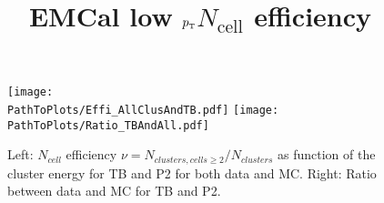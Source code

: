 \documentclass[ALICE]{ALICE_analysis_notes}
\newcommand{\pT}{$p_{\mbox{\tiny T}}$\xspace}
\newcommand{\PathToPlots}{/home/joshua/PCG_Software/EMCal_NCellEffi/13TeVNomB_Wide/Pi0Tagging_13TeV_nom_04_26_WithTRD_WithBorderCells_1cellFT/pdf}
\begin{document}
\title{EMCal low \pT $N_{\text{cell}}$ efficiency}





%

\tableofcontents

\newpage





\begin{figure}[b]
	\centering
	\texttt{[image: \\PathToPlots/Effi\_AllClusAndTB.pdf]}
	\texttt{[image: \\PathToPlots/Ratio\_TBAndAll.pdf]}
	\caption{Left: $N_{cell}$ efficiency $\nu = N_{clusters, cells \geq 2} / N_{clusters}$ as function of the cluster energy for TB and P2 for both data and MC. Right: Ratio between data and MC for TB and P2. }
	\label{fig:NCells_Cor}
\end{figure}
\end{document}
